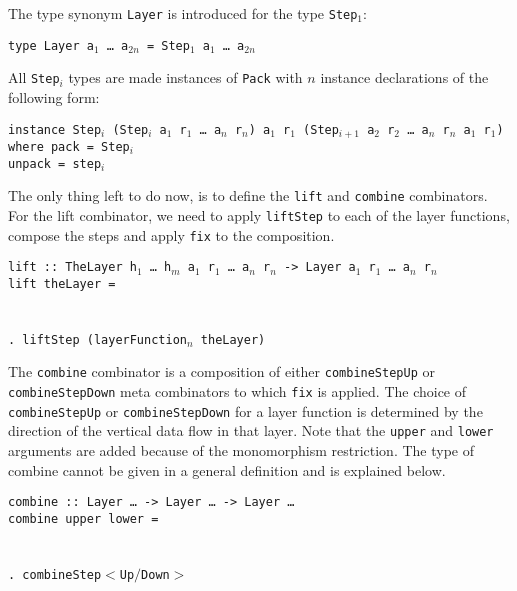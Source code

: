 The type synonym \texttt{Layer} is introduced for the type \texttt{Step$_1$}:

{\tt type Layer a$_1$ \dots~a$_{2n}$ = Step$_1$ a$_1$ \dots~a$_{2n}$}

All \texttt{Step$_i$} types are made instances of \texttt{Pack} with $n$ instance declarations of the following form:

\begin{tabbing}
{\tt i}\={\tt nstance Step$_i$ (Step$_i$ a$_1$ r$_1$ \dots~a$_n$  r$_n$) a$_1$ r$_1$ (Step$_{i+1}$ a$_2$ r$_2$ \dots~a$_n$ r$_n$ a$_1$ r$_1$)}\\
\> {\tt where }\={\tt pack = Step$_i$}\\
\>\> {\tt unpack = step$_i$}
\end{tabbing}

The only thing left to do now, is to define the \texttt{lift} and \texttt{combine} combinators. For the lift combinator, we need to apply \texttt{liftStep} to each of the layer functions, compose the steps and apply \texttt{fix} to the composition. 

\begin{tabbing}
{\tt lift}\verb| :: |{\tt TheLayer h$_1$ \dots ~h$_m$ a$_1$ r$_1$ \dots ~a$_n$ r$_n$ -> Layer a$_1$ r$_1$ \dots ~a$_n$ r$_n$}\\
{\tt li}\={\tt ft t}\={\tt heLayer = }\\
\\
\>\>{\tt \dots}\\ 
\>\>\verb|. lift|{\tt Step (layerFunction$_n$ theLayer)}
\end{tabbing}

The \texttt{combine} combinator is a composition of either \texttt{combineStepUp} or \texttt{combineStepDown} meta combinators to which \texttt{fix} is applied. The choice of \texttt{combineStepUp} or \texttt{combineStepDown} for a layer function is determined by the direction of the vertical data flow in that layer. Note that the \texttt{upper} and \texttt{lower} arguments are added because of the monomorphism restriction. The type of combine cannot be given in a general definition and is explained below.

\begin{tabbing}
{\tt combine}\verb| :: |{\tt Layer \dots}\verb| -> |{\tt Layer \dots}\verb| -> |{\tt Layer \dots }\\
{\tt co}\={\tt mbin}\={\tt e upper lower = }\\
\\
\>\>{\tt \dots}\\ 
\>\>\verb|. combine|{\tt Step$<$Up$/$Down$>$}\\
\>
\end{tabbing}

